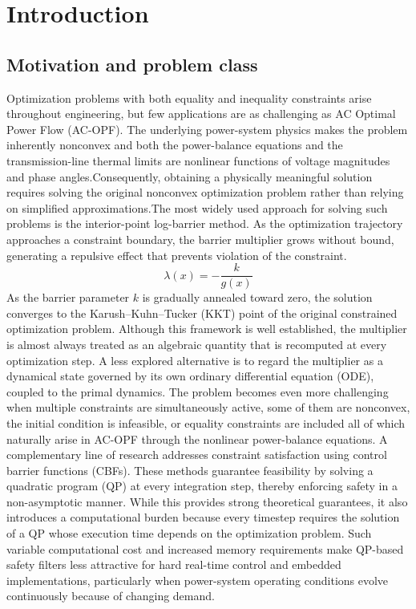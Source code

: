\documentclass[11pt,onecolumn]{article}
\theoremstyle{definition}
\theoremstyle{remark}
\begin{document}
\vspace{6pt}
\tableofcontents
\newpage

\section{Introduction}\label{sec:introduction}

\subsection{Motivation and problem class}

Optimization problems with both equality and inequality constraints arise throughout engineering, but few applications are as challenging as AC Optimal Power Flow (AC-OPF). The underlying power-system physics makes the problem inherently nonconvex and both the power-balance equations and the transmission-line thermal limits are nonlinear functions of voltage magnitudes and phase angles.Consequently, obtaining a physically meaningful solution requires solving the original nonconvex optimization problem rather than relying on simplified approximations.The most widely used approach for solving such problems is the interior-point log-barrier method. As the optimization trajectory approaches a constraint boundary, the barrier multiplier grows without bound, generating a repulsive effect that prevents violation of the constraint.
\[
\lambda(x) = -\frac{k}{g(x)}
\]
 As the barrier parameter $k$ is gradually annealed toward zero, the solution converges to the Karush--Kuhn--Tucker (KKT) point of the original constrained optimization problem. Although this framework is well established, the multiplier is almost always treated as an algebraic quantity that is recomputed at every optimization step. A less explored alternative is to regard the multiplier as a dynamical state governed by its own ordinary differential equation (ODE), coupled to the primal dynamics. The problem becomes even more challenging when multiple constraints are simultaneously active, some of them are nonconvex, the initial condition is infeasible, or equality constraints are included all of which naturally arise in AC-OPF through the nonlinear power-balance equations. A complementary line of research addresses constraint satisfaction using control barrier functions (CBFs). These methods guarantee feasibility by solving a quadratic program (QP) at every integration step, thereby enforcing safety in a non-asymptotic manner. While this provides strong theoretical guarantees, it also introduces a computational burden because every timestep requires the solution of a QP whose execution time depends on the optimization problem. Such variable computational cost and increased memory requirements make QP-based safety filters less attractive for hard real-time control and embedded implementations, particularly when power-system operating conditions evolve continuously because of changing demand.\\
\end{document}
